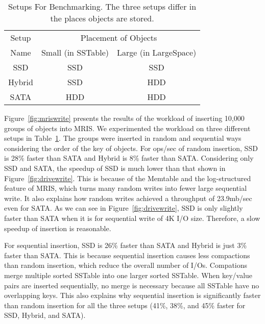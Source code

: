 \begin{table}[tc]
{\centering \footnotesize
\begin{tabular}{c|c|c}
\hline 
  Setup & \multicolumn{2}{c}{Placement of Objects} \\ \cline{2-3}
   Name & Small (in SSTable) & Large (in LargeSpace) \\ \hline
  SSD & SSD & SSD \\
  Hybrid & SSD & HDD \\
  SATA & HDD & HDD \\ \hline 
\end{tabular}
 \caption{Setups For Benchmarking. The three setups differ in the
 places objects are stored.}
\label{tbl:setups}
}
\end{table}

Figure~\ref{fig:mriswrite} presents the results of the workload of
inserting 10,000 groups of objects into MRIS. We experimented the
workload on three different setups in Table~\ref{tbl:setups}. The
groups were inserted in random and sequential ways considering the
order of the key of objects. For ops/sec of random insertion, SSD is
28\% faster than SATA and Hybrid is 8\% faster than SATA. Considering
only SSD and SATA, the speedup of SSD is much lower than that shown in
Figure~\ref{fig:drivewrite}. This is because of the Memtable and the
log-structured feature of MRIS, which turns many random writes into
fewer large sequential write. It also explains how random writes
achieved a throughput of 23.9mb/sec even for SATA. As we can see in
Figure~\ref{fig:drivewrite}, SSD is only slightly faster than SATA
when it is for sequential write of 4K I/O size. Therefore, a slow
speedup of insertion is reasonable.

For sequential insertion, SSD is 26\% faster than SATA and Hybrid is
just 3\% faster than SATA. This is because sequential insertion causes
less compactions than random insertion, which reduce the overall
number of I/Os.  Compations merge multiple sorted SSTable into one
larger sorted SSTable. When key/value pairs are inserted sequentially,
no merge is necessary because all SSTable have no overlapping keys.
This also explains why sequential insertion is significantly faster
than random insertion for all the three setups (41\%, 38\%, and 45\%
faster for SSD, Hybrid, and SATA). 



